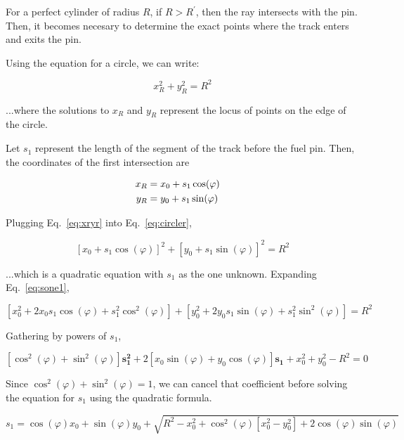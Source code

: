 \documentclass[12pt]{article}
\begin{document}
For a perfect cylinder of radius $R$, if $R > R^\prime$, then the ray intersects with the pin. Then, it becomes necesary to determine the exact points where the track enters and exits the pin.

Using the equation for a circle, we can write:

\begin{equation}\label{eq:circler}
x_R^2 + y_R^2 = R^2
\end{equation}

...where the solutions to $x_R$ and $y_R$ represent the locus of points on the edge of the circle.

Let $s_1$ represent the length of the segment of the track before the fuel pin. Then, the coordinates of the first intersection are

\begin{align}\label{eq:xryr}
x_R &= x_0 + s_1 \cos(\varphi)
\cr
y_R &= y_0 + s_1 \sin(\varphi)
\end{align}

Plugging Eq.~\ref{eq:xryr} into Eq.~\ref{eq:circler},

\begin{equation}\label{eq:sone1}
[x_0 + s_1 \cos(\varphi)]^2 + [y_0 + s_1 \sin(\varphi)]^2 = R^2
\end{equation}

...which is a quadratic equation with $s_1$ as the one unknown. Expanding Eq.~\ref{eq:sone1},

\begin{equation}\label{eq:sone2}
[ x_0^2 + 2x_0 s_1 \cos(\varphi) + s_1^2 \cos^2(\varphi) ] + 
[ y_0^2 + 2y_0 s_1 \sin(\varphi) + s_1^2 \sin^2(\varphi) ] = R^2
\end{equation}

Gathering by powers of $s_1$,

\begin{equation}\label{eq:sone3}
[ \cos^2(\varphi) + \sin^2(\varphi) ] \mathbf{s_1^2} + 
2 [ x_0 \sin(\varphi) + y_0 \cos(\varphi) ]  \mathbf{s_1} + 
x_0^2 + y_0^2 - R^2 = 0
\end{equation}

Since $\cos^2(\varphi) + \sin^2(\varphi) = 1$, we can cancel that coefficient before solving the equation for $s_1$ using the quadratic formula.

\begin{equation}\label{eq:s1}
s_1 = \cos(\varphi) x_0 + \sin(\varphi) y_0 +
\sqrt{ R^2 - x_0^2 +
\cos^2(\varphi) [x_0^2 - y_0^2] + 2 \cos(\varphi) \sin(\varphi)}
\end{equation}
\end{document}
